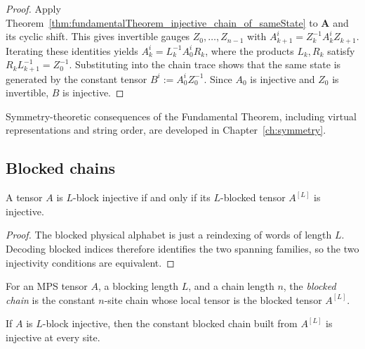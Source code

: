 \begin{proof}
    Apply Theorem~\ref{thm:fundamentalTheorem_injective_chain_of_sameState}
    to $\mathbf{A}$ and its cyclic shift.
    This gives invertible gauges $Z_0, \ldots, Z_{n-1}$ with
    $A_{k+1}^i = Z_k^{-1} A_k^i Z_{k+1}$.
    Iterating these identities yields
    $A_k^i = L_k^{-1} A_0^i R_k$, where the products $L_k, R_k$ satisfy
    $R_k L_{k+1}^{-1} = Z_0^{-1}$.
    Substituting into the chain trace shows that the same state is generated
    by the constant tensor $B^i := A_0^i Z_0^{-1}$.
    Since $A_0$ is injective and $Z_0$ is invertible, $B$ is injective.
\end{proof}

\noindent Symmetry-theoretic consequences of the Fundamental Theorem,
including virtual representations and string order, are developed in
Chapter~\ref{ch:symmetry}.

\subsection{Blocked chains}

\begin{lemma}
    \label{lem:isNBlkInjective_iff_blockTensor_isInjective}
    \leanok
    A tensor $A$ is $L$-block injective if and only if its $L$-blocked
    tensor $A^{[L]}$ is injective.
\end{lemma}

\begin{proof}
    \leanok
    The blocked physical alphabet is just a reindexing of words of length $L$.
    Decoding blocked indices therefore identifies the two spanning families,
    so the two injectivity conditions are equivalent.
\end{proof}

\begin{definition}
    \label{def:blocked_chain}
    \leanok
    For an MPS tensor $A$, a blocking length $L$, and a chain length $n$, the
    \emph{blocked chain} is the constant $n$-site chain whose local tensor is
    the blocked tensor $A^{[L]}$.
\end{definition}

\begin{lemma}
    \label{lem:blocked_chain_isInjective}
    \leanok
    If $A$ is $L$-block injective, then the constant blocked chain built from
    $A^{[L]}$ is injective at every site.
\end{lemma}

